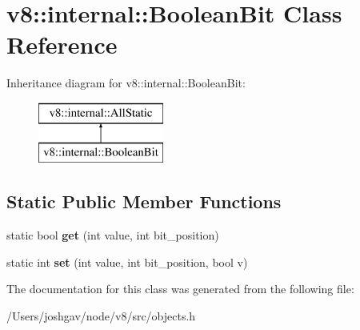 \hypertarget{classv8_1_1internal_1_1_boolean_bit}{}\section{v8\+:\+:internal\+:\+:Boolean\+Bit Class Reference}
\label{classv8_1_1internal_1_1_boolean_bit}
Inheritance diagram for v8\+:\+:internal\+:\+:Boolean\+Bit\+:\begin{figure}[H]
\begin{center}
\leavevmode
\includegraphics[height=2.000000cm]{classv8_1_1internal_1_1_boolean_bit}
\end{center}
\end{figure}
\subsection*{Static Public Member Functions}
\begin{DoxyCompactItemize}
\item 
static bool {\bfseries get} (int value, int bit\+\_\+position)\hypertarget{classv8_1_1internal_1_1_boolean_bit_a0021135995e316cd5abd7d024da90f3b}{}\label{classv8_1_1internal_1_1_boolean_bit_a0021135995e316cd5abd7d024da90f3b}

\item 
static int {\bfseries set} (int value, int bit\+\_\+position, bool v)\hypertarget{classv8_1_1internal_1_1_boolean_bit_afbfebc642ff88f009b5097ab8374dc64}{}\label{classv8_1_1internal_1_1_boolean_bit_afbfebc642ff88f009b5097ab8374dc64}

\end{DoxyCompactItemize}


The documentation for this class was generated from the following file\+:\begin{DoxyCompactItemize}
\item 
/\+Users/joshgav/node/v8/src/objects.\+h\end{DoxyCompactItemize}
